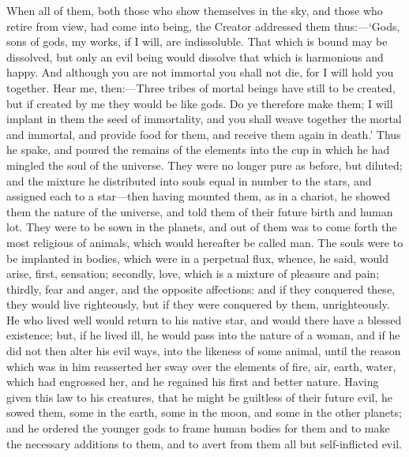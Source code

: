 \documentclass[11pt,letter]{article}
\begin{document}
\par  When all of them, both those who show themselves in the sky, and those who retire from view, had come into being, the Creator addressed them thus:—‘Gods, sons of gods, my works, if I will, are indissoluble. That which is bound may be dissolved, but only an evil being would dissolve that which is harmonious and happy. And although you are not immortal you shall not die, for I will hold you together. Hear me, then:—Three tribes of mortal beings have still to be created, but if created by me they would be like gods. Do ye therefore make them; I will implant in them the seed of immortality, and you shall weave together the mortal and immortal, and provide food for them, and receive them again in death.’ Thus he spake, and poured the remains of the elements into the cup in which he had mingled the soul of the universe. They were no longer pure as before, but diluted; and the mixture he distributed into souls equal in number to the stars, and assigned each to a star—then having mounted them, as in a chariot, he showed them the nature of the universe, and told them of their future birth and human lot. They were to be sown in the planets, and out of them was to come forth the most religious of animals, which would hereafter be called man. The souls were to be implanted in bodies, which were in a perpetual flux, whence, he said, would arise, first, sensation; secondly, love, which is a mixture of pleasure and pain; thirdly, fear and anger, and the opposite affections: and if they conquered these, they would live righteously, but if they were conquered by them, unrighteously. He who lived well would return to his native star, and would there have a blessed existence; but, if he lived ill, he would pass into the nature of a woman, and if he did not then alter his evil ways, into the likeness of some animal, until the reason which was in him reasserted her sway over the elements of fire, air, earth, water, which had engrossed her, and he regained his first and better nature. Having given this law to his creatures, that he might be guiltless of their future evil, he sowed them, some in the earth, some in the moon, and some in the other planets; and he ordered the younger gods to frame human bodies for them and to make the necessary additions to them, and to avert from them all but self-inflicted evil.
\end{document}
